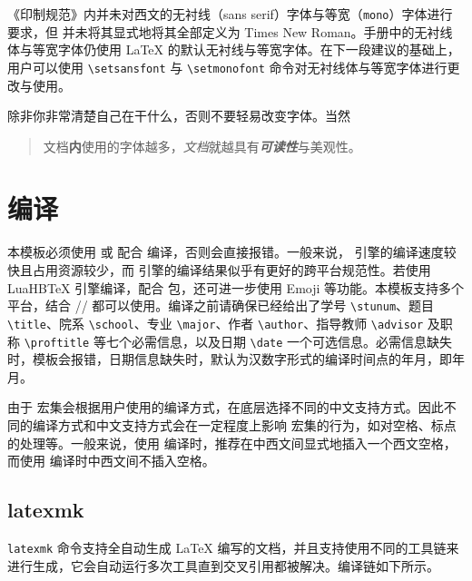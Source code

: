 \begin{notice}
    《印制规范》内并未对西文的无衬线（\textsf{sans serif}）字体与等宽（\texttt{mono}）字体进行要求，但 \WhuThesis 并未将其显式地将其全部定义为 Times New Roman。手册中的无衬线体与等宽字体仍使用 \LaTeX{} 的默认无衬线与等宽字体。在下一段建议的基础上，用户可以使用 \verb|\setsansfont| 与 \verb|\setmonofont| 命令对无衬线体与等宽字体进行更改与使用。

    除非你非常清楚自己在干什么，否则不要轻易改变字体。当然\\
    \begin{quote}
        文档\textbf{内}{\tiny 使用}的字体越{\huge \textsf{多}}，\textit{文档}就越具有\textbf{\textit{可读性}}{\large 与}{\Large 美}{\huge 观}{\Huge 性}。
    \end{quote}
\end{notice}

\section{编译}
本模板必须使用  或  配合  编译，否则会直接报错。一般来说， 引擎的编译速度较快且占用资源较少，而  引擎的编译结果似乎有更好的跨平台规范性。若使用 LuaHB\TeX{} 引擎编译，配合  包，还可进一步使用 Emoji 等功能。本模板支持多个平台，结合 // 都可以使用。编译之前请确保已经给出了学号 \verb|\stunum|、题目 \verb|\title|、院系 \verb|\school|、专业 \verb|\major|、作者 \verb|\author|、指导教师 \verb|\advisor| 及职称 \verb|\proftitle| 等七个必需信息，以及日期 \verb|\date| 一个可选信息。必需信息缺失时，模板会报错，日期信息缺失时，默认为汉数字形式的编译时间点的年月，即\zhdigits{\the\year}年\zhnumber{\the\month}月。

\begin{notice}
    由于 \CTeX 宏集会根据用户使用的编译方式，在底层选择不同的中文支持方式。因此不同的编译方式和中文支持方式会在一定程度上影响 \CTeX 宏集的行为，如对空格、标点的处理等。一般来说，使用  编译时，推荐在中西文间显式地插入一个西文空格，而使用  编译时中西文间不插入空格。
\end{notice}

\subsection{latexmk}
\verb|latexmk| 命令支持全自动生成 \LaTeX{} 编写的文档，并且支持使用不同的工具链来进行生成，它会自动运行多次工具直到交叉引用都被解决。编译链如下所示。

